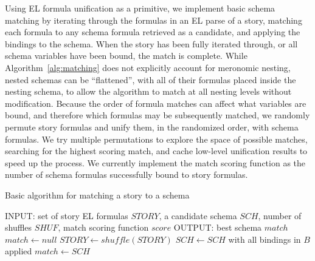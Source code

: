 \iffalse
Using EL formula unification as a primitive, we implement basic schema matching by iterating through the formulas in an EL parse of a story, matching each formula to any schema formula retrieved as a candidate, and applying the bindings to the schema. When the story has been fully iterated through, or all schema variables have been bound, the match is complete.
While Algorithm~\ref{alg:matching} does not explicitly account for meronomic nesting, nested schemas can be ``flattened'', with all of their formulas placed inside the nesting schema, to allow the algorithm to match at all nesting levels without modification.
Because the order of formula matches can affect what variables are bound, and therefore which formulas may be subsequently matched, we randomly permute story formulas and unify them, in the randomized order, with schema formulas.
We try multiple permutations to explore the space of possible matches, searching for the highest scoring match, and cache low-level unification results to speed up the process.
We currently implement the match scoring function as the number of schema formulas successfully bound to story formulas.


\begin{algorithm}
\caption{Basic algorithm for matching a story to a schema}
\label{alg:matching}
\begin{algorithmic}
\STATE INPUT: set of story EL formulas $STORY$, a candidate schema $SCH$, number of shuffles $SHUF$, match scoring function $score$
\STATE OUTPUT: best schema $match$
\STATE $match \gets null$
    \STATE $STORY \gets shuffle(STORY)$
                \STATE $SCH \gets SCH$ with all bindings in $B$ applied
            \ENDIF
        \ENDFOR
    \ENDFOR
        \STATE $match \gets SCH$
    \ENDIF
\ENDFOR
\end{algorithmic}
\end{algorithm}

